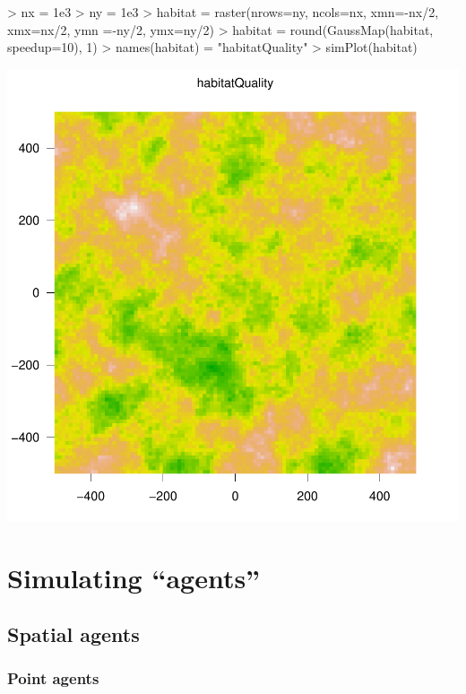 \documentclass{article}
\begin{document}
\begin{Schunk}
\begin{Sinput}
> nx = 1e3
> ny = 1e3
> habitat = raster(nrows=ny, ncols=nx, xmn=-nx/2, xmx=nx/2, ymn =-ny/2, ymx=ny/2)
> habitat = round(GaussMap(habitat, speedup=10), 1)
> names(habitat) = "habitatQuality"
> simPlot(habitat)
\end{Sinput}
\end{Schunk}
\includegraphics{introduction-habitat-map}

\newpage

\section{Simulating ``agents''}

\paragraph{}

\subsection{Spatial agents}

\subsubsection{Point agents}
\end{document}
